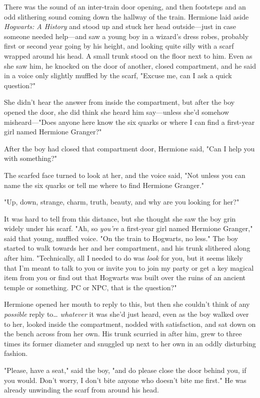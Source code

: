 There was the sound of an inter-train door opening, and then footsteps and an 
odd slithering sound coming down the hallway of the train. Hermione laid aside 
\emph{Hogwarts: A History} and stood up and stuck her head outside---just in 
case someone needed help---and saw a young boy in a wizard's dress robes, 
probably first or second year going by his height, and looking quite silly with 
a scarf wrapped around his head. A small trunk stood on the floor next to him. 
Even as she saw him, he knocked on the door of another, closed compartment, and 
he said in a voice only slightly muffled by the scarf, "Excuse me, can I ask a 
quick question?"

She didn't hear the answer from inside the compartment, but after the boy 
opened the door, she did think she heard him say---unless she'd somehow 
misheard---"Does anyone here know the six quarks or where I can find a 
first-year girl named Hermione Granger?"

After the boy had closed that compartment door, Hermione said, "Can I help you 
with something?"

The scarfed face turned to look at her, and the voice said, "Not unless you can 
name the six quarks or tell me where to find Hermione Granger."

"Up, down, strange, charm, truth, beauty, and why are you looking for her?"

It was hard to tell from this distance, but she thought she saw the boy grin 
widely under his scarf. "Ah, so \emph{you're} a first-year girl named Hermione 
Granger," said that young, muffled voice. "On the train to Hogwarts, no less." 
The boy started to walk towards her and her compartment, and his trunk 
slithered along after him. "Technically, all I needed to do was \emph{look} for 
you, but it seems likely that I'm meant to talk to you or invite you to join my 
party or get a key magical item from you or find out that Hogwarts was built 
over the ruins of an ancient temple or something. PC or NPC, that is the 
question?"

Hermione opened her mouth to reply to this, but then she couldn't think of any 
\emph{possible} reply to{\ldots} \emph{whatever} it was she'd just heard, even 
as the boy walked over to her, looked inside the compartment, nodded with 
satisfaction, and sat down on the bench across from her own. His trunk scurried 
in after him, grew to three times its former diameter and snuggled up next to 
her own in an oddly disturbing fashion.

"Please, have a seat," said the boy, "and do please close the door behind you, 
if you would. Don't worry, I don't bite anyone who doesn't bite me first." He 
was already unwinding the scarf from around his head.


